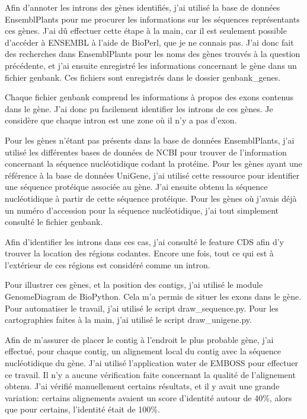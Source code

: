 \documentclass[10.9pt]{article} %
\begin{document}
Afin d'annoter les introns des gènes identifiés, j'ai utilisé la base de données EnsemblPlants pour me
procurer les informations sur les séquences représentants ces gènes. J'ai dû effectuer cette étape à la main,
car il est seulement possible d'accéder à ENSEMBL à l'aide de BioPerl, que je ne connais pas. J'ai donc fait des
recherches dans EnsemblPlants pour les noms des gènes trouvés à la question précédente, et j'ai ensuite enregistré
les informations concernant le gène dans un fichier genbank. Ces fichiers sont enregistrés dans le dossier genbank\_genes.

Chaque fichier genbank comprend les informations à propos des exons contenus dans le gène. J'ai donc pu facilement identifier
les introns de ces gènes. Je considère que chaque intron est une zone où il n'y a pas d'exon.

Pour les gènes n'étant pas présents dans la base de données EnsemblPlants, j'ai utilisé les différentes bases de données de NCBI
pour trouver de l'information concernant la séquence nucléotidique codant la protéine. Pour les gènes ayant une référence à la
base de données UniGene, j'ai utilisé cette ressource pour identifier une séquence protéique associée au gène. J'ai ensuite
obtenu la séquence nucléotidique à partir de cette séquence protéique. Pour les gènes où j'avais déjà un numéro d'accession pour
la séquence nucléotidique, j'ai tout simplement consulté le fichier genbank.

Afin d'identifier les introns dans ces cas, j'ai consulté le feature CDS afin d'y trouver la location des régions codantes. Encore
une fois, tout ce qui est à l'extérieur de ces régions est considéré comme un intron.

Pour illustrer ces gènes, et la position des contigs, j'ai utilisé le module GenomeDiagram de BioPython. Cela m'a permis de situer
les exons dans le gène. Pour automatiser le travail, j'ai utilisé le script draw\_sequence.py. Pour les cartographies faites à la
main, j'ai utilisé le script draw\_unigene.py.

Afin de m'assurer de placer le contig à l'endroit le plus probable gène, j'ai effectué, pour chaque contig, un alignement local du
contig avec la séquence nucléotidique du gène. J'ai utilisé l'application water de EMBOSS pour effectuer ce travail. Il n'y a aucune
vérification faite concernant la qualité de l'alignement obtenu. J'ai vérifié manuellement certains résultats, et il y avait une
grande variation: certains alignements avaient un score d'identité autour de 40\%, alors que pour certains, l'identité était de 100\%.
\end{document}
